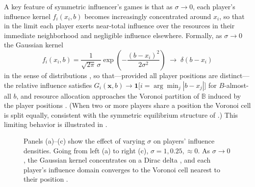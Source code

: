 \documentclass{article}
\begin{document}
                A key feature of symmetric influencer's games is that as $\sigma \to 0$, each player's influence kernel $f_i(x_i, b)$ becomes increasingly concentrated around $x_i$, so that in the limit each player exerts near-total influence over the resources in their immediate neighborhood and negligible influence elsewhere. Formally, as $\sigma \to 0$ the Gaussian kernel 
                \begin{equation}
                    f_i(x_i, b) = \frac{1}{\sqrt{2\pi}\,\sigma} 
                    \exp\!\left(-\frac{(b - x_i)^2}{2\sigma^2}\right) 
                    \;\longrightarrow\; \delta(b - x_i)
                \end{equation}
                in the sense of distributions \cite{billingsley1995probability}, so that---provided all player positions are distinct---the relative influence satisfies $G_i(\mathbf{x}, b) \to \mathbf{1}\bigl[i = \arg\min_{j}|b - x_j|\bigr]$ for $B$-almost-all $b$, and resource allocation approaches the Voronoi partition of $\mathbb{B}$ induced by the player positions \cite{aurenhammer1991voronoi}. (When two or more players share a position the Voronoi cell is split equally, consistent with the symmetric equilibrium structure of .) This limiting behavior is illustrated in .
                \begin{figure}[htbp!]
                \centering
                    \begin{subfigure}[b]{0.3\linewidth}
                        
                    \end{subfigure}
                    \begin{subfigure}[b]{0.3\linewidth}
                       
                    \end{subfigure}
                    \begin{subfigure}[b]{0.3\linewidth}
                       
                    \end{subfigure}
                    \caption{Panels (a)--(c) show the effect of varying $\sigma$ on players' influence densities. Going from left (a) to right (c), $\sigma = 1, 0.25, \approx 0$. As $\sigma \to 0$, the Gaussian kernel concentrates on a Dirac delta \cite{billingsley1995probability}, and each player's influence domain converges to the Voronoi cell nearest to their position \cite{aurenhammer1991voronoi}.}
                    \label{fig:sigma_density}
                \end{figure}
\end{document}

